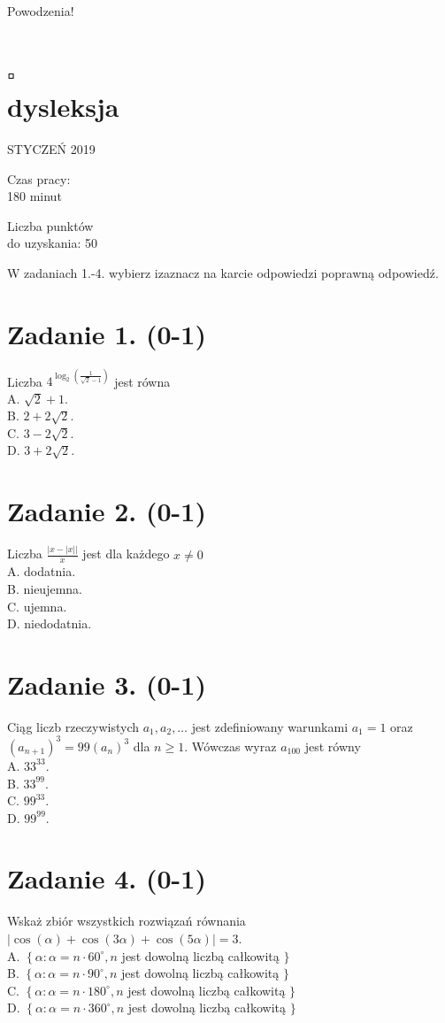 \documentclass[10pt]{article}
\begin{document}
Powodzenia!

\section*{\(\square\) \\
 dysleksja}
STYCZEŃ 2019

Czas pracy:\\
180 minut

Liczba punktów\\
do uzyskania: 50

W zadaniach 1.-4. wybierz izaznacz na karcie odpowiedzi poprawną odpowiedź.

\section*{Zadanie 1. (0-1)}
Liczba \(4^{\log _{2}\left(\frac{1}{\sqrt{2}-1}\right)}\) jest równa\\
A. \(\sqrt{2}+1\).\\
B. \(2+2 \sqrt{2}\).\\
C. \(3-2 \sqrt{2}\).\\
D. \(3+2 \sqrt{2}\).

\section*{Zadanie 2. (0-1)}
Liczba \(\frac{|x-|x||}{x}\) jest dla każdego \(x \neq 0\)\\
A. dodatnia.\\
B. nieujemna.\\
C. ujemna.\\
D. niedodatnia.

\section*{Zadanie 3. (0-1)}
Ciąg liczb rzeczywistych \(a_{1}, a_{2}, \ldots\) jest zdefiniowany warunkami \(a_{1}=1\) oraz \(\left(a_{n+1}\right)^{3}=99\left(a_{n}\right)^{3}\) dla \(n \geqslant 1\). Wówczas wyraz \(a_{100}\) jest równy\\
A. \(33^{33}\).\\
B. \(33^{99}\).\\
C. \(99^{33}\).\\
D. \(99^{99}\).

\section*{Zadanie 4. (0-1)}
Wskaż zbiór wszystkich rozwiązań równania \(|\cos (\alpha)+\cos (3 \alpha)+\cos (5 \alpha)|=3\).\\
A. \(\left\{\alpha: \alpha=n \cdot 60^{\circ}, n\right.\) jest dowolną liczbą całkowitą \(\}\)\\
B. \(\left\{\alpha: \alpha=n \cdot 90^{\circ}, n\right.\) jest dowolną liczbą całkowitą \(\}\)\\
C. \(\left\{\alpha: \alpha=n \cdot 180^{\circ}, n\right.\) jest dowolną liczbą całkowitą \(\}\)\\
D. \(\left\{\alpha: \alpha=n \cdot 360^{\circ}, n\right.\) jest dowolną liczbą całkowitą \(\}\)
\end{document}
